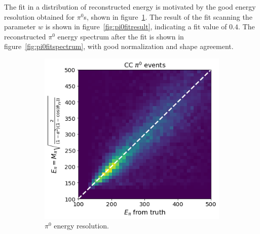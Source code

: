 The fit in a distribution of reconstructed energy is motivated by the good energy resolution obtained for $\pi^0$s, shown in figure~\ref{fig:pi0eres}. The result of the fit scanning the parameter $w$ is shown in figure~\ref{fig:pi0fitresult}, indicating a fit value of $0.4$. The reconstructed $\pi^0$ energy spectrum after the fit is shown in figure~\ref{fig:pi0fitspectrum}, with good normalization and shape agreement.


\begin{figure}[H] 
\begin{center}
    \begin{subfigure}[b]{0.3\textwidth}
    \centering
    \includegraphics[width=1.00\textwidth]{pi0/pi0tune/ccpi0.png}
    \caption{\label{fig:pi0eres} $\pi^0$ energy resolution.}
    \end{subfigure}
    \begin{subfigure}[b]{0.27\textwidth}
    \centering

\end{subfigure}
\end{center}
\end{figure}

